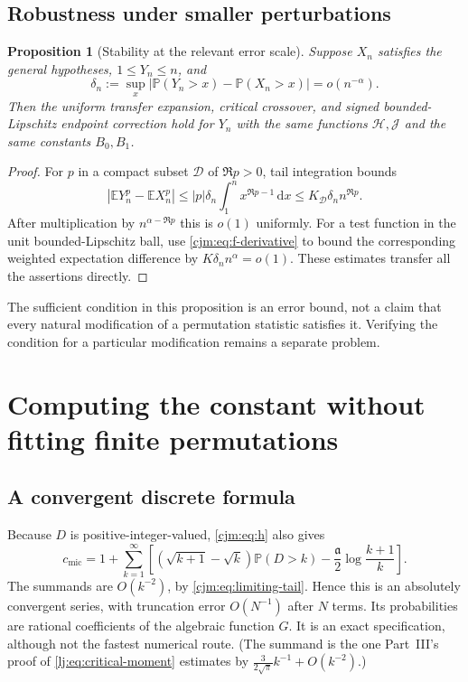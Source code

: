 \documentclass[11pt,a4paper]{article}
\newtheorem{proposition}[proposition]{Proposition}
\theoremstyle{definition}\newaliascnt{definition}{theorem}
\theoremstyle{remark}\newaliascnt{remark}{theorem}
\newcommand{\dd}{\mathrm d}
\newcommand{\ljP}{\mathbb P}
\newcommand{\ljE}{\mathbb E}
\newcommand{\cjmic}{c_{\mathrm{mic}}}
\begin{document}
\subsection{Robustness under smaller perturbations}
\begin{proposition}[Stability at the relevant error scale]
\label{cjm:prop:stability}
Suppose $X_n$ satisfies the general hypotheses, $1\le Y_n\le n$, and
\[
 \delta_n:=\sup_x|\ljP(Y_n>x)-\ljP(X_n>x)|=o(n^{-\alpha}).
\]
Then the uniform transfer expansion, critical crossover, and signed
bounded-Lipschitz endpoint correction hold for $Y_n$ with the same
functions $\mathcal H,\mathcal J$ and the same constants $B_0,B_1$.
\end{proposition}
\begin{proof}
For $p$ in a compact subset $\mathcal D$ of $\Re p>0$, tail integration
bounds
\[
 |\ljE Y_n^p-\ljE X_n^p|
 \le |p|\delta_n\int_1^n x^{\Re p-1}\,\dd x
 \le K_{\mathcal D}\delta_n n^{\Re p}.
\]
After multiplication by $n^{\alpha-\Re p}$ this is $o(1)$ uniformly.
For a test function in the unit bounded-Lipschitz ball, use
\eqref{cjm:eq:f-derivative} to bound the corresponding weighted expectation
difference by $K\delta_n n^\alpha=o(1)$. These estimates transfer all the
assertions directly.
\end{proof}

The sufficient condition in this proposition is an error bound, not a
claim that every natural modification of a permutation statistic satisfies
it. Verifying the condition for a particular modification remains a
separate problem.

\section{Computing the constant without fitting finite permutations}
\label{cjm:sec:quadrature}

\subsection{A convergent discrete formula}
Because $D$ is positive-integer-valued, \eqref{cjm:eq:h} also gives
\begin{equation}
 \cjmic=1+\sum_{k=1}^\infty\left[
  (\sqrt{k+1}-\sqrt k)\ljP(D>k)
       -\frac{\mathfrak a}2\log\frac{k+1}{k}\right].
 \label{cjm:eq:h-series}
\end{equation}
The summands are $O(k^{-2})$, by \eqref{cjm:eq:limiting-tail}. Hence this is
an absolutely convergent series, with truncation error $O(N^{-1})$ after
$N$ terms. Its probabilities are rational coefficients of the algebraic
function $G$. It is an exact specification, although not the fastest
numerical route. (The summand is the one Part~III's proof of
\eqref{lj:eq:critical-moment} estimates by $\frac3{2\sqrt\pi}k^{-1}+O(k^{-2})$.)
\end{document}
